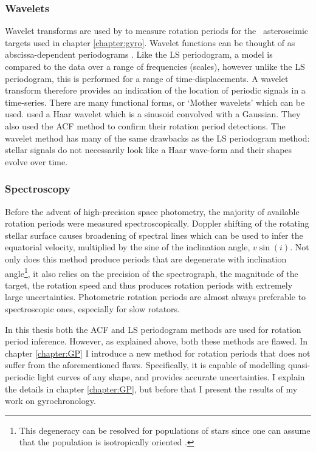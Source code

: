 \subsubsection{Wavelets}
Wavelet transforms are used by \citet{Garcia2014} to measure rotation periods
for the \kepler\ asteroseimic targets used in chapter \ref{chapter:gyro}.
Wavelet functions can be thought of as abscissa-dependent periodograms
\citep{Carter2009}.
Like the LS periodogram, a model is compared to the data over a range of
frequencies (scales), however unlike the LS periodogram, this is performed for
a range of time-displacements.
A wavelet transform therefore provides an indication of the location of
periodic signals in a time-series.
There are many functional forms, or `Mother wavelets' which can be used.
\citet{Garcia2014} used a Haar wavelet which is a sinusoid convolved with a
Gaussian.
They also used the ACF method to confirm their rotation period detections.
The wavelet method has many of the same drawbacks as the LS periodogram
method: stellar signals do not necessarily look like a Haar wave-form and
their shapes evolve over time.

\subsubsection{Spectroscopy}
Before the advent of high-precision space photometry, the majority of
available rotation periods were measured spectroscopically.
Doppler shifting of the rotating stellar surface causes broadening of spectral
lines which can be used to infer the equatorial velocity, multiplied by the
sine of the inclination angle, $v\sin(i)$.
Not only does this method produce periods that are degenerate with inclination
angle\footnote{This degeneracy can be resolved for populations of stars since
one can assume that the population is isotropically oriented
\citep[\eg][]{Andrews2014}.}, it also relies on the precision of the
spectrograph, the magnitude of the target, the rotation speed and thus
produces rotation periods with extremely large uncertainties.
Photometric rotation periods are almost always preferable to spectroscopic
ones, especially for slow rotators.

In this thesis both the ACF and LS periodogram methods are used for rotation
period inference.
However, as explained above, both these methods are flawed.
In chapter \ref{chapter:GP} I introduce a new method for rotation
periods that does not suffer from the aforementioned flaws.
Specifically, it is capable of modelling quasi-periodic light curves of any
shape, and provides accurate uncertainties.
I explain the details in chapter \ref{chapter:GP}, but before that I
present the results of my work on gyrochronology.
